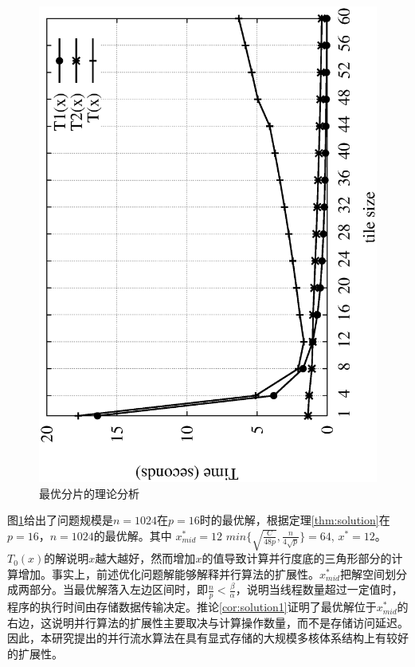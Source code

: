 \begin{flushleft}
\begin{figure}[!htbp]
\begin{center}
		\includegraphics[scale=0.6]{Img/Chap_Algorithm/model}
		\caption{最优分片的理论分析}
		\label{fig:model}
	\end{center}
\end{figure}

图\ref{fig:model}给出了问题规模是$n=1024$在$p=16$时的最优解，根据定理\ref{thm:solution}在$p=16$，$n=1024$的最优解。其中  $x_{mid}^{*}=12$
$min\{\sqrt{\frac{C}{48p}},\frac{n}{4\sqrt{p}}\}=64$, $x^{*}=12$。
$T_{0}(x)$的解说明$x$越大越好，然而增加$x$的值导致计算并行度底的三角形部分的计算增加。事实上，前述优化问题解能够解释并行算法的扩展性。$x_{mid}^{*}$把解空间划分成两部分。当最优解落入左边区间时，即$\frac{n}{p}<\frac{\beta}{\alpha}$，说明当线程数量超过一定值时，程序的执行时间由存储数据传输决定。推论\ref{cor:solution1}证明了最优解位于$x_{mid}^{*}$的右边，这说明并行算法的扩展性主要取决与计算操作数量，而不是存储访问延迟。因此，本研究提出的并行流水算法在具有显式存储的大规模多核体系结构上有较好的扩展性。


\end{flushleft}
